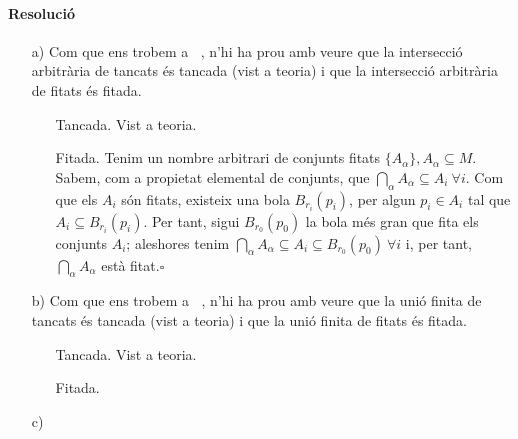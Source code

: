 \documentclass[11pt]{article}
\DeclareMathOperator{\Rn}{\mathbb{R}^n}
\begin{document}
\paragraph{Resolució}
\begin{itemize}
	\item[a)] Com que ens trobem a $\Rn$, n'hi ha prou amb veure que la intersecció arbitrària de tancats és tancada (vist a teoria) i que la intersecció arbitrària de fitats és fitada.
	\begin{itemize}
		\item[Tancada.] Vist a teoria.
		\item[Fitada.] Tenim un nombre arbitrari de conjunts fitats $\{A_{\alpha}\},A_{\alpha}\subseteq M$. Sabem, com a propietat elemental de conjunts, que $\bigcap_{\alpha}A_{\alpha}\subseteq A_i\ \forall i.$ Com que els $A_i$ són fitats, existeix una bola $B_{r_i}(p_i)$, per algun $p_i\in A_i$ tal que $A_i\subseteq B_{r_i}(p_i)$. Per tant, sigui $B_{r_0}(p_0)$ la bola més gran que fita els conjunts $A_i$; aleshores tenim $\bigcap_{\alpha}A_{\alpha}\subseteq A_i\subseteq B_{r_0}(p_0)\ \forall i$ i, per tant, $\bigcap_{\alpha}A_{\alpha}$ està fitat.$\square$
	\end{itemize}
	\item[b)] Com que ens trobem a $\Rn$, n'hi ha prou amb veure que la unió finita de tancats és tancada (vist a teoria) i que la unió finita de fitats és fitada.
	\begin{itemize}
		\item[Tancada.] Vist a teoria.
		\item[Fitada.] 
	\end{itemize}
	\item[c)]
\end{itemize}
\end{document}
